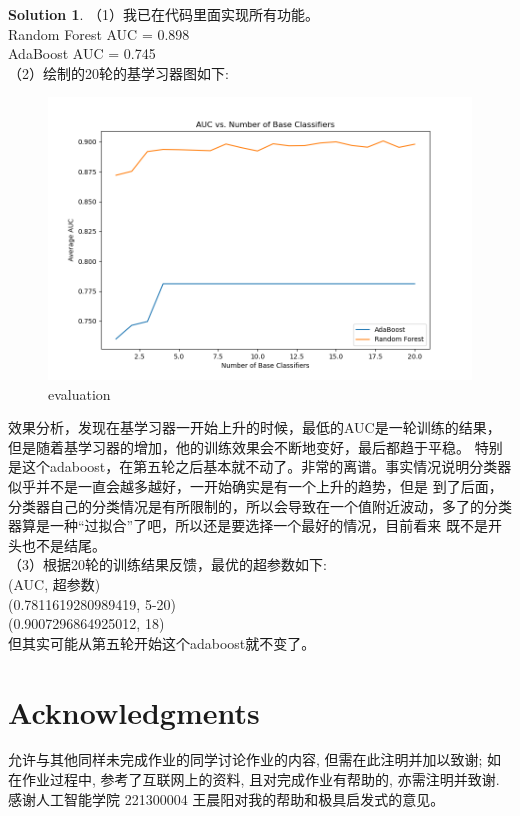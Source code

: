 \documentclass[a4paper,UTF8]{article}
\numberwithin{equation}{section}
\theoremstyle{definition}
\newtheorem*{solution}{Solution}
\begin{document}
\begin{solution}
    （1）我已在代码里面实现所有功能。\\
    Random Forest AUC = 0.898\\
    AdaBoost AUC = 0.745\\
    （2）绘制的20轮的基学习器图如下:\\
    \begin{figure}[h]
        \centering
        \includegraphics[width=1\linewidth]{evaluation.png}
        \caption{evaluation}
    \end{figure}
    效果分析，发现在基学习器一开始上升的时候，最低的AUC是一轮训练的结果，但是随着基学习器的增加，他的训练效果会不断地变好，最后都趋于平稳。
    特别是这个adaboost，在第五轮之后基本就不动了。非常的离谱。事实情况说明分类器似乎并不是一直会越多越好，一开始确实是有一个上升的趋势，但是
    到了后面，分类器自己的分类情况是有所限制的，所以会导致在一个值附近波动，多了的分类器算是一种“过拟合”了吧，所以还是要选择一个最好的情况，目前看来
    既不是开头也不是结尾。\\
    （3）根据20轮的训练结果反馈，最优的超参数如下:\\
    (AUC, 超参数)\\
    (0.7811619280989419, 5-20)\\
    (0.9007296864925012, 18)\\
    但其实可能从第五轮开始这个adaboost就不变了。

\end{solution}

\newpage

\section*{Acknowledgments}
允许与其他同样未完成作业的同学讨论作业的内容, 但需在此注明并加以致谢; 如在作业过程中, 参考了互联网上的资料, 且对完成作业有帮助的, 亦需注明并致谢.\\
感谢人工智能学院 221300004 王晨阳对我的帮助和极具启发式的意见。
\end{document}
